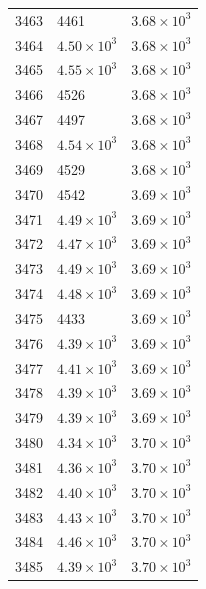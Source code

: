 \begin{table}[H]
\begin{tabular}{lll}
3463 & 4461 & $\displaystyle 3.68 \times 10^{3}$ \\
3464 & $\displaystyle 4.50 \times 10^{3}$ & $\displaystyle 3.68 \times 10^{3}$ \\
3465 & $\displaystyle 4.55 \times 10^{3}$ & $\displaystyle 3.68 \times 10^{3}$ \\
3466 & 4526 & $\displaystyle 3.68 \times 10^{3}$ \\
3467 & 4497 & $\displaystyle 3.68 \times 10^{3}$ \\
3468 & $\displaystyle 4.54 \times 10^{3}$ & $\displaystyle 3.68 \times 10^{3}$ \\
3469 & 4529 & $\displaystyle 3.68 \times 10^{3}$ \\
3470 & 4542 & $\displaystyle 3.69 \times 10^{3}$ \\
3471 & $\displaystyle 4.49 \times 10^{3}$ & $\displaystyle 3.69 \times 10^{3}$ \\
3472 & $\displaystyle 4.47 \times 10^{3}$ & $\displaystyle 3.69 \times 10^{3}$ \\
3473 & $\displaystyle 4.49 \times 10^{3}$ & $\displaystyle 3.69 \times 10^{3}$ \\
3474 & $\displaystyle 4.48 \times 10^{3}$ & $\displaystyle 3.69 \times 10^{3}$ \\
3475 & 4433 & $\displaystyle 3.69 \times 10^{3}$ \\
3476 & $\displaystyle 4.39 \times 10^{3}$ & $\displaystyle 3.69 \times 10^{3}$ \\
3477 & $\displaystyle 4.41 \times 10^{3}$ & $\displaystyle 3.69 \times 10^{3}$ \\
3478 & $\displaystyle 4.39 \times 10^{3}$ & $\displaystyle 3.69 \times 10^{3}$ \\
3479 & $\displaystyle 4.39 \times 10^{3}$ & $\displaystyle 3.69 \times 10^{3}$ \\
3480 & $\displaystyle 4.34 \times 10^{3}$ & $\displaystyle 3.70 \times 10^{3}$ \\
3481 & $\displaystyle 4.36 \times 10^{3}$ & $\displaystyle 3.70 \times 10^{3}$ \\
3482 & $\displaystyle 4.40 \times 10^{3}$ & $\displaystyle 3.70 \times 10^{3}$ \\
3483 & $\displaystyle 4.43 \times 10^{3}$ & $\displaystyle 3.70 \times 10^{3}$ \\
3484 & $\displaystyle 4.46 \times 10^{3}$ & $\displaystyle 3.70 \times 10^{3}$ \\
3485 & $\displaystyle 4.39 \times 10^{3}$ & $\displaystyle 3.70 \times 10^{3}$ \\

\end{tabular}
\end{table}

